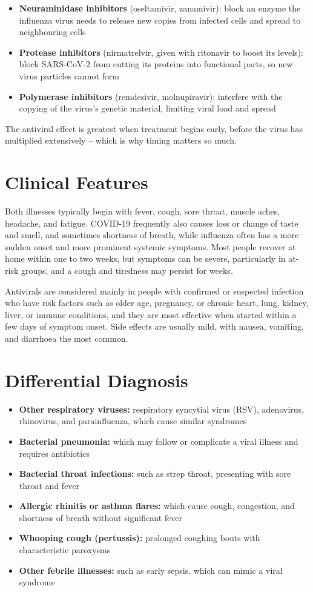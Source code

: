 \begin{itemize}
    \item \textbf{Neuraminidase inhibitors} (oseltamivir, zanamivir): block an enzyme the influenza virus needs to release new copies from infected cells and spread to neighbouring cells
    \item \textbf{Protease inhibitors} (nirmatrelvir, given with ritonavir to boost its levels): block SARS-CoV-2 from cutting its proteins into functional parts, so new virus particles cannot form
    \item \textbf{Polymerase inhibitors} (remdesivir, molnupiravir): interfere with the copying of the virus's genetic material, limiting viral load and spread
\end{itemize}

The antiviral effect is greatest when treatment begins early, before the virus has multiplied extensively -- which is why timing matters so much.

\section*{Clinical Features}
Both illnesses typically begin with fever, cough, sore throat, muscle aches, headache, and fatigue. COVID-19 frequently also causes loss or change of taste and smell, and sometimes shortness of breath, while influenza often has a more sudden onset and more prominent systemic symptoms. Most people recover at home within one to two weeks, but symptoms can be severe, particularly in at-risk groups, and a cough and tiredness may persist for weeks.

Antivirals are considered mainly in people with confirmed or suspected infection who have risk factors such as older age, pregnancy, or chronic heart, lung, kidney, liver, or immune conditions, and they are most effective when started within a few days of symptom onset. Side effects are usually mild, with nausea, vomiting, and diarrhoea the most common.

\section*{Differential Diagnosis}
\begin{itemize}
    \item \textbf{Other respiratory viruses:} respiratory syncytial virus (RSV), adenovirus, rhinovirus, and parainfluenza, which cause similar syndromes
    \item \textbf{Bacterial pneumonia:} which may follow or complicate a viral illness and requires antibiotics
    \item \textbf{Bacterial throat infections:} such as strep throat, presenting with sore throat and fever
    \item \textbf{Allergic rhinitis or asthma flares:} which cause cough, congestion, and shortness of breath without significant fever
    \item \textbf{Whooping cough (pertussis):} prolonged coughing bouts with characteristic paroxysms
    \item \textbf{Other febrile illnesses:} such as early sepsis, which can mimic a viral syndrome
\end{itemize}

